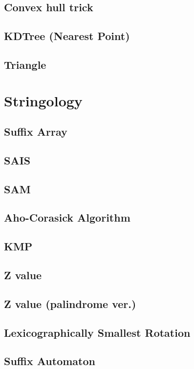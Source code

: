 \documentclass[a4paper,10pt,twocolumn,oneside]{article}
\begin{document}
\subsection{Convex hull trick}


\subsection{KDTree (Nearest Point)}


\subsection{Triangle}


\section{Stringology}

\subsection{Suffix Array}


\subsection{SAIS}


\subsection{SAM}


\subsection{Aho-Corasick Algorithm}


\subsection{KMP}


\subsection{Z value}


\subsection{Z value (palindrome ver.)}


\subsection{Lexicographically Smallest Rotation}


\subsection{Suffix Automaton}

\end{document}
